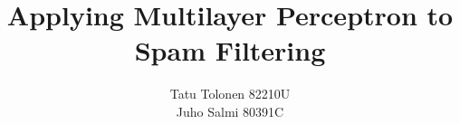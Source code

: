 \documentclass[12pt,a4paper,finnish,oneside]{article}
\begin{document}



\pagestyle{plain}


%
%

\author{Tatu Tolonen 82210U \\ Juho Salmi 80391C}

\title{Applying Multilayer Perceptron to Spam Filtering}

\end{document}
